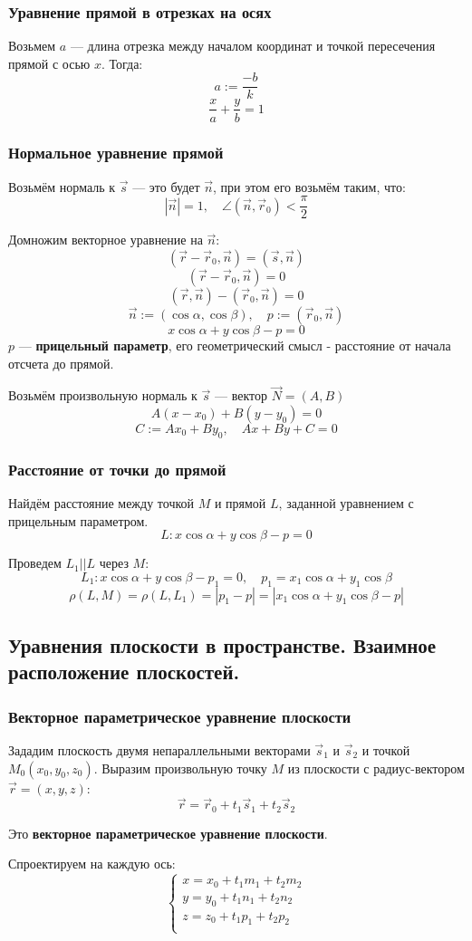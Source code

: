 \subsubsection{Уравнение прямой в отрезках на осях}
Возьмем $a$ --- длина отрезка между началом координат и точкой пересечения прямой с осью $x$. Тогда:
$$a:=\frac{-b}{k}$$
$$\frac{x}{a}+\frac{y}{b}=1$$
\subsubsection{Нормальное уравнение прямой}
Возьмём нормаль к $\vec s$ --- это будет $\vec n$, при этом его возьмём таким, что:
$$|\vec n|=1, \quad \angle(\vec n, \vec r_0)<\frac{\pi}{2}$$

Домножим векторное уравнение на $\vec n$:
$$(\vec r-\vec r_0,\vec n)=(\vec s,\vec n)$$
$$(\vec r-\vec r_0,\vec n)=0$$
$$(\vec r,\vec n) - (\vec r_0,\vec n)=0$$
$$\vec n:=(\cos \alpha, \cos \beta), \quad p:=(\vec r_0, \vec n)$$
$$x\cos\alpha+y\cos\beta-p=0$$
$p$ --- \textbf{прицельный параметр}, его геометрический смысл - расстояние
от начала отсчета до прямой.

Возьмём произвольную нормаль к $\vec s$ --- вектор $\vec N=(A,B)$
$$A(x-x_0)+B(y-y_0)=0$$
$$C:=Ax_0+By_0,\quad Ax+By+C=0$$

\subsubsection{Расстояние от точки до прямой}
Найдём расстояние между точкой $M$ и прямой $L$, заданной уравнением с прицельным параметром.
$$L:x\cos\alpha+y\cos\beta-p=0$$

Проведем $L_1||L$ через $M$:
$$L_1:x\cos\alpha+y\cos\beta-p_1=0, \quad p_1=x_1\cos\alpha+y_1\cos\beta$$
$$\rho(L,M)=\rho(L,L_1)=|p_1-p|=|x_1\cos\alpha+y_1\cos\beta-p|$$

\subsection{Уравнения плоскости в пространстве. Взаимное расположение плоскостей.}
\subsubsection{Векторное параметрическое уравнение плоскости}
Зададим плоскость двумя непараллельными векторами $\vec s_1$ и $\vec s_2$ и точкой $M_0(x_0,y_0,z_0)$. Выразим произвольную точку $M$ из плоскости с радиус-вектором $\vec r=(x,y,z)$:
$$\vec r=\vec r_0+t_1\vec s_1+t_2\vec s_2$$
\begin{definition}
    Это \textbf{векторное параметрическое уравнение плоскости}.
\end{definition}
Спроектируем на каждую ось:
$$\begin{cases}
    x=x_0+t_1m_1+t_2m_2 \\
    y=y_0+t_1n_1+t_2n_2 \\
    z=z_0+t_1p_1+t_2p_2 \\
\end{cases}$$

